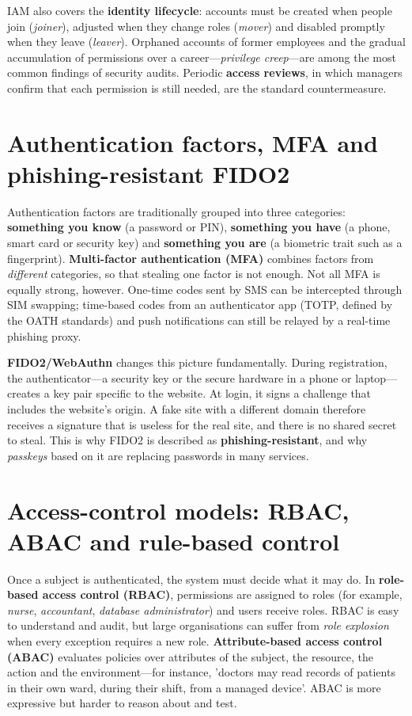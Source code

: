 \documentclass[11pt,openany]{book}
\begin{document}
IAM also covers the \textbf{identity lifecycle}: accounts must be created when people join (\emph{joiner}), adjusted when they change roles (\emph{mover}) and disabled promptly when they leave (\emph{leaver}). Orphaned accounts of former employees and the gradual accumulation of permissions over a career—\emph{privilege creep}—are among the most common findings of security audits. Periodic \textbf{access reviews}, in which managers confirm that each permission is still needed, are the standard countermeasure.

\section{Authentication factors, MFA and phishing-resistant FIDO2}\label{sec:8.2}
Authentication factors are traditionally grouped into three categories: \textbf{something you know} (a password or PIN), \textbf{something you have} (a phone, smart card or security key) and \textbf{something you are} (a biometric trait such as a fingerprint). \textbf{Multi-factor authentication (MFA)} combines factors from \emph{different} categories, so that stealing one factor is not enough. Not all MFA is equally strong, however. One-time codes sent by SMS can be intercepted through SIM swapping; time-based codes from an authenticator app (TOTP, defined by the OATH standards) and push notifications can still be relayed by a real-time phishing proxy.

\textbf{FIDO2/WebAuthn} changes this picture fundamentally. During registration, the authenticator—a security key or the secure hardware in a phone or laptop—creates a key pair specific to the website. At login, it signs a challenge that includes the website's origin. A fake site with a different domain therefore receives a signature that is useless for the real site, and there is no shared secret to steal. This is why FIDO2 is described as \textbf{phishing-resistant}, and why \emph{passkeys} based on it are replacing passwords in many services.

\section{Access-control models: RBAC, ABAC and rule-based control}\label{sec:8.3}
Once a subject is authenticated, the system must decide what it may do. In \textbf{role-based access control (RBAC)}, permissions are assigned to roles (for example, \emph{nurse}, \emph{accountant}, \emph{database administrator}) and users receive roles. RBAC is easy to understand and audit, but large organisations can suffer from \emph{role explosion} when every exception requires a new role. \textbf{Attribute-based access control (ABAC)} evaluates policies over attributes of the subject, the resource, the action and the environment—for instance, 'doctors may read records of patients in their own ward, during their shift, from a managed device'. ABAC is more expressive but harder to reason about and test.
\end{document}
